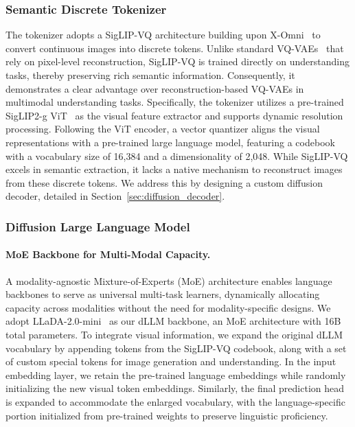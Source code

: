\subsubsection{Semantic Discrete Tokenizer}
The tokenizer adopts a SigLIP-VQ architecture building upon X-Omni~\citep{xomni} to convert continuous images into discrete tokens. 
%
Unlike standard VQ-VAEs~\citep{esser2021taming,wang2024emu3} that rely on pixel-level reconstruction, SigLIP-VQ is trained directly on understanding tasks, thereby preserving rich semantic information.
%
Consequently, it demonstrates a clear advantage over reconstruction-based VQ-VAEs in multimodal understanding tasks.
%
Specifically, the tokenizer utilizes a pre-trained SigLIP2-g ViT~\citep{tschannen2025siglip} as the visual feature extractor and supports dynamic resolution processing.
%
Following the ViT encoder, a vector quantizer aligns the visual representations with a pre-trained large language model, featuring a codebook with a vocabulary size of 16,384 and a dimensionality of 2,048.
%
While SigLIP-VQ excels in semantic extraction, it lacks a native mechanism to reconstruct images from these discrete tokens.
%
We address this by designing a custom diffusion decoder, detailed in Section~\ref{sec:diffusion_decoder}.

\subsubsection{Diffusion Large Language Model}
\paragraph{MoE Backbone for Multi-Modal Capacity.}
A modality-agnostic Mixture-of-Experts (MoE) architecture enables language backbones to serve as universal multi-task learners, dynamically allocating capacity across modalities without the need for modality-specific designs.
%
We adopt LLaDA-2.0-mini~\citep{LLaDA2} as our dLLM backbone, an MoE architecture with 16B total parameters.
%
To integrate visual information, we expand the original dLLM vocabulary by appending tokens from the SigLIP-VQ codebook, along with a set of custom special tokens for image generation and understanding.
%
In the input embedding layer, we retain the pre-trained language embeddings while randomly initializing the new visual token embeddings.
%
Similarly, the final prediction head is expanded to accommodate the enlarged vocabulary, with the language-specific portion initialized from pre-trained weights to preserve linguistic proficiency.



